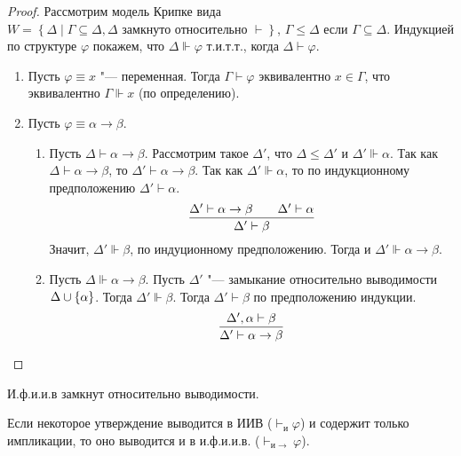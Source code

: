 \begin{proof}
    Рассмотрим модель Крипке вида $W = \left\{\Delta \mid \Gamma \subseteq \Delta, \Delta\text{ замкнуто относительно }\vdash\right\}$,
    $\Gamma \leq \Delta$ если $\Gamma \subseteq \Delta$.
    Индукцией по структуре $\varphi$ покажем, что $\Delta \Vdash \varphi$ т.и.т.т., когда $\Delta \vdash \varphi$.
    \begin{enumerate}
        \item Пусть $\varphi \equiv x$ "--- переменная. Тогда $\Gamma \vdash \varphi$ эквивалентно $x \in \Gamma$, что эквивалентно $\Gamma\Vdash x$ (по определению).
        \item Пусть $\varphi \equiv \alpha \rightarrow \beta$.
        \begin{enumerate}[label=(\asbuk*)]
            \item Пусть $\Delta \vdash \alpha\rightarrow\beta$.
                Рассмотрим такое $\Delta'$, что $\Delta \leq \Delta'$ и $\Delta' \Vdash \alpha$.
                Так как $\Delta \vdash \alpha\rightarrow\beta$, то $\Delta' \vdash \alpha\rightarrow\beta$.
                Так как $\Delta' \Vdash \alpha$, то по индукционному предположению $\Delta' \vdash \alpha$.
                \[
                    \infer{\Delta' \vdash \beta}{\Delta' \vdash \alpha \rightarrow \beta && \Delta' \vdash \alpha}
                \]
                Значит, $\Delta' \Vdash \beta$, по индуционному предположению. Тогда и $\Delta' \Vdash \alpha\rightarrow\beta$.
            \item Пусть $\Delta \Vdash \alpha\rightarrow\beta$.
                Пусть $\Delta'$ "--- замыкание относительно выводимости $\Delta \cup \left\{\alpha\right\}$.
                Тогда $\Delta' \Vdash \beta$. Тогда $\Delta' \vdash \beta$ по предположению индукции.
                \[
                    \infer{\Delta' \vdash \alpha \rightarrow \beta}{\Delta', \alpha \vdash \beta} 
                    \qedhere
                \]
        \end{enumerate}
    \end{enumerate}
\end{proof}

\begin{corollary}
    И.ф.и.и.в замкнут относительно выводимости.
\end{corollary}
Если некоторое утверждение выводится в ИИВ ($\vdash_{и} \varphi$) и содержит только импликации,
то оно выводится и в и.ф.и.и.в. ($\vdash_{и \rightarrow} \varphi$).
